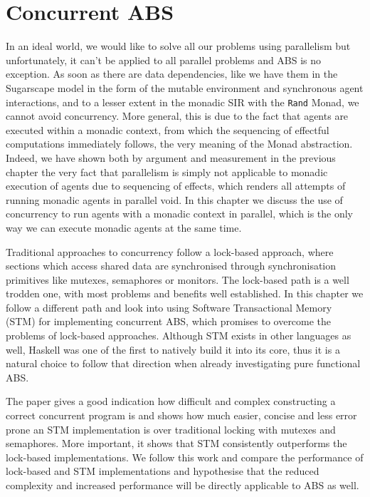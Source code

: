 \chapter{Concurrent ABS}
\label{ch:concurrent_abs}
In an ideal world, we would like to solve all our problems using parallelism but unfortunately, it can't be applied to all parallel problems and ABS is no exception. As soon as there are data dependencies, like we have them in the Sugarscape model in the form of the mutable environment and synchronous agent interactions, and to a lesser extent in the monadic SIR with the \texttt{Rand} Monad, we cannot avoid concurrency. More general, this is due to the fact that agents are executed within a monadic context, from which the  sequencing of effectful computations immediately follows, the very meaning of the Monad abstraction. Indeed, we have shown both by argument and measurement in the previous chapter the very fact that parallelism is simply not applicable to monadic execution of agents due to sequencing of effects, which renders all attempts of running monadic agents in parallel void. In this chapter we discuss the use of concurrency to run agents with a monadic context in parallel, which is the only way we can execute monadic agents at the same time.

\medskip

Traditional approaches to concurrency follow a lock-based approach, where sections which access shared data are synchronised through synchronisation primitives like mutexes, semaphores or monitors. The lock-based path is a well trodden one, with most problems and benefits well established. In this chapter we follow a different path and look into using Software Transactional Memory (STM) for implementing concurrent ABS, which promises to overcome the problems of lock-based approaches. Although STM exists in other languages as well, Haskell was one of the first to natively build it into its core, thus it is a natural choice to follow that direction when already investigating pure functional ABS.

The paper \cite{discolo_lock_2006} gives a good indication how difficult and complex constructing a correct concurrent program is and shows how much easier, concise and less error prone an STM implementation is over traditional locking with mutexes and semaphores. More important, it shows that STM consistently outperforms the lock-based implementations. We follow this work and compare the performance of lock-based and STM implementations and hypothesise that the reduced complexity and increased performance will be directly applicable to ABS as well.

